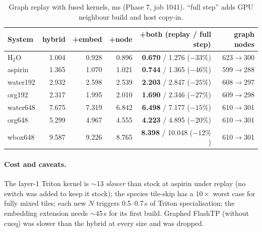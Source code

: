\begin{table}[h]
\centering
\caption{Graph replay with fused kernels, ms (Phase 7, job 1041). ``full step'' adds GPU neighbour build and host copy-in.}
\label{tab:fuse7}
\small
\begin{tabular}{lrrrrr}
\toprule
System & hybrid & +embed & +node & \textbf{+both} (replay / full step) & graph nodes \\
\midrule
H$_2$O & 1.004 & 0.928 & 0.896 & \textbf{0.670} / 1.276 ($-33\%$) & 623$\to$300 \\
aspirin & 1.365 & 1.070 & 1.021 & \textbf{0.744} / 1.365 ($-46\%$) & 599$\to$288 \\
water192 & 2.932 & 2.598 & 2.539 & \textbf{2.203} / 2.847 ($-25\%$) & 608$\to$297 \\
org192 & 2.317 & 1.995 & 2.010 & \textbf{1.690} / 2.346 ($-27\%$) & 609$\to$298 \\
water648 & 7.675 & 7.319 & 6.842 & \textbf{6.498} / 7.177 ($-15\%$) & 610$\to$301 \\
org648 & 5.299 & 4.967 & 4.555 & \textbf{4.223} / 4.895 ($-20\%$) & 610$\to$301 \\
wbox648 & 9.587 & 9.226 & 8.765 & \textbf{8.398} / 10.048 ($-12\%$) & 610$\to$301 \\
\bottomrule
\end{tabular}
\end{table}

\paragraph{Cost and caveats.} The layer-1  Triton kernel is $\sim$13\us{} \emph{slower} than stock at aspirin under replay (no switch was added to keep it stock); the species tile-skip has a $10\times$ worst case for fully mixed tiles; each new $N$ triggers 0.5--0.7\,s of Triton specialisation; the embedding extension needs $\sim$45\,s for its first build. Graphed FlashTP (without cueq) was slower than the hybrid at every size and was dropped.

